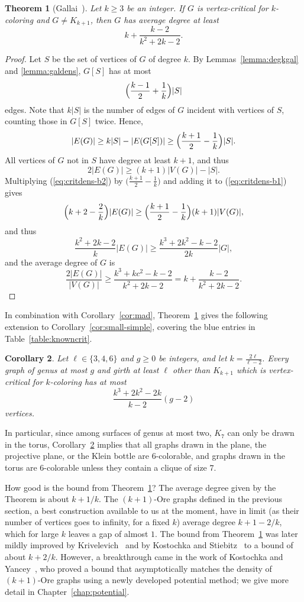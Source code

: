 \documentclass[12pt,twoside,openright,a4paper]{book}
\newtheorem{theorem}{Theorem}[chapter]
\newtheorem{corollary}[theorem]{Corollary}
\begin{document}
\begin{theorem}[Gallai~\cite{galfor}]\label{thm:critdens}
Let $k\ge 3$ be an integer.  If $G$ is vertex-critical for $k$-coloring and $G\neq K_{k+1}$, then $G$ has average degree
at least
$$k+\frac{k-2}{k^2+2k-2}.$$
\end{theorem}
\begin{proof}
Let $S$ be the set of vertices of $G$ of degree $k$.  By Lemmas~\ref{lemma:degkgal} and \ref{lemma:galdens},
$G[S]$ has at most $$\Bigl(\frac{k-1}{2}+\frac{1}{k}\Bigr)|S|$$ edges.  Note that $k|S|$ is the number of edges of $G$ incident with vertices of $S$,
counting those in $G[S]$ twice.  Hence,
\begin{equation}\label{eq:critdens-b1}
|E(G)|\ge k|S|-|E(G[S])|\ge \Bigl(\frac{k+1}{2}-\frac{1}{k}\Bigr)|S|.
\end{equation}
All vertices of $G$ not in $S$ have degree at least $k+1$, and thus
\begin{equation}\label{eq:critdens-b2}
2|E(G)|\ge (k+1)|V(G)|-|S|.
\end{equation}
Multiplying (\ref{eq:critdens-b2}) by $\bigl(\tfrac{k+1}{2}-\tfrac{1}{k}\bigr)$ and adding it to (\ref{eq:critdens-b1}) gives
$$\Bigl(k+2-\frac{2}{k}\Bigr)|E(G)|\ge\Bigl(\frac{k+1}{2}-\frac{1}{k}\Bigr)(k+1)|V(G)|,$$
and thus
$$\frac{k^2+2k-2}{k}|E(G)|\ge\frac{k^3+2k^2-k-2}{2k}|G|,$$
and the average degree of $G$ is
$$\frac{2|E(G)|}{|V(G)|}\ge \frac{k^3+kc^2-k-2}{k^2+2k-2}=k+\frac{k-2}{k^2+2k-2}.$$
\end{proof}
In combination with Corollary~\ref{cor:mad}, Theorem~\ref{thm:critdens} gives the following extension to Corollary~\ref{cor:small-simple}, covering the blue entries in Table~\ref{table:knowncrit}.
\begin{corollary}\label{cor:small-medium}
Let $\ell\in\{3,4,6\}$ and $g\ge 0$ be integers, and let $k=\tfrac{2\ell}{\ell-2}$.  Every graph of genus at most $g$ and girth at least $\ell$
other than $K_{k+1}$ which is vertex-critical for $k$-coloring has at most $$\frac{k^3+2k^2-2k}{k-2}(g-2)$$ vertices.
\end{corollary}
In particular, since among surfaces of genus at most two, $K_7$ can only be drawn in the torus,
Corollary~\ref{cor:small-medium} implies that all graphs drawn in the plane, the projective plane, or the Klein bottle
are $6$-colorable, and graphs drawn in the torus are $6$-colorable unless they contain a clique of size $7$.

How good is the bound from Theorem~\ref{thm:critdens}?  The average degree given by the Theorem is about $k+1/k$.
The $(k+1)$-Ore graphs defined in the previous section, a best construction available to us at the moment,
have in limit (as their number of vertices goes to infinity, for a fixed $k$) average degree $k+1-2/k$, which for large $k$ leaves a gap of almost $1$.
The bound from Theorem~\ref{thm:critdens} was later mildly improved by Krivelevich~\cite{krivelevich1997minimal}
and by Kostochka and Stiebitz~\cite{kostochka1996excess} to a bound of about $k+2/k$.  However, a breakthrough came in the work of Kostochka and Yancey~\cite{koyanore},
who proved a bound that asymptotically matches the density of $(k+1)$-Ore graphs using a newly developed potential method; we give more detail in Chapter~\ref{chap:potential}.
\end{document}
